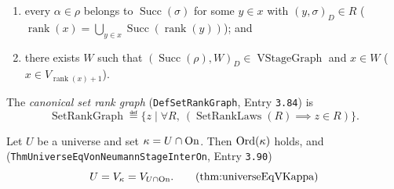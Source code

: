 \begin{definition}
\begin{enumerate}
\item every $\alpha \in \rho$ belongs to $\operatorname{Succ}(\sigma)$ for some $y \in x$ with $(y, \sigma)_D \in R$ ($\operatorname{rank}(x) = \bigcup_{y \in x} \operatorname{Succ}(\operatorname{rank}(y))$); and
\item there exists $W$ such that $(\operatorname{Succ}(\rho), W)_D \in \operatorname{VStageGraph}$ and $x \in W$ ($x \in V_{\operatorname{rank}(x)+1}$).
\end{enumerate}
The \emph{canonical set rank graph} (\texttt{DefSetRankGraph}, Entry \texttt{3.84}) is
\[
\operatorname{SetRankGraph} \eqdef \{z \mid \forall R,\ (\operatorname{SetRankLaws}(R) \implies z \in R)\}.
\]
\end{definition}

\begin{theorem}[Characterization of Universes as $U = V_{U \cap \On}$]
Let $U$ be a universe and set $\kappa = U \cap \mathrm{On}$. Then $\mathrm{Ord}(\kappa)$ holds, and (\texttt{ThmUniverseEqVonNeumannStageInterOn}, Entry \texttt{3.90})
\[
U = V_\kappa = V_{U \cap \On}.
\labeltagd{thm}{universeEqVKappa}
\]
\end{theorem}
